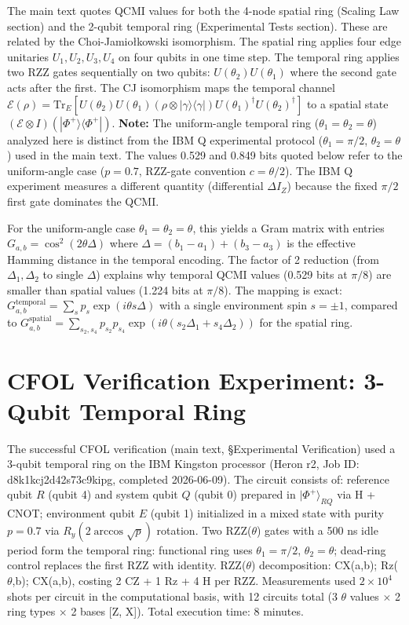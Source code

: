 \documentclass[aps,prl,showpacs]{revtex4-2}
\begin{document}
The main text quotes QCMI values for both the 4-node spatial ring (Scaling Law section) and the 2-qubit temporal ring (Experimental Tests section). These are related by the Choi-Jamio{\l}kowski isomorphism. The spatial ring applies four edge unitaries $U_1,U_2,U_3,U_4$ on four qubits in one time step. The temporal ring applies two RZZ gates sequentially on two qubits: $U(\theta_2)U(\theta_1)$ where the second gate acts after the first. The CJ isomorphism maps the temporal channel $\mathcal{E}(\rho) = \mathrm{Tr}_E[U(\theta_2)U(\theta_1)(\rho\otimes|\gamma\rangle\langle\gamma|)U(\theta_1)^\dagger U(\theta_2)^\dagger]$ to a spatial state $(\mathcal{E}\otimes I)(|\Phi^+\rangle\langle\Phi^+|)$. \textbf{Note:} The uniform-angle temporal ring ($\theta_1=\theta_2=\theta$) analyzed here is distinct from the IBM Q experimental protocol ($\theta_1=\pi/2$, $\theta_2=\theta$) used in the main text. The values 0.529 and 0.849 bits quoted below refer to the uniform-angle case ($p=0.7$, RZZ-gate convention $c=\theta/2$). The IBM Q experiment measures a different quantity (differential $\Delta I_Z$) because the fixed $\pi/2$ first gate dominates the QCMI.

For the uniform-angle case $\theta_1=\theta_2=\theta$, this yields a Gram matrix with entries $G_{a,b} = \cos^2(2\theta\Delta)$ where $\Delta = (b_1-a_1)+(b_3-a_3)$ is the effective Hamming distance in the temporal encoding. The factor of 2 reduction (from $\Delta_1,\Delta_2$ to single $\Delta$) explains why temporal QCMI values (0.529 bits at $\pi/8$) are smaller than spatial values (1.224 bits at $\pi/8$). The mapping is exact: $G^{\mathrm{temporal}}_{a,b} = \sum_{s} p_s \exp(i\theta s\Delta)$ with a single environment spin $s=\pm 1$, compared to $G^{\mathrm{spatial}}_{a,b} = \sum_{s_2,s_4} p_{s_2}p_{s_4} \exp(i\theta(s_2\Delta_1+s_4\Delta_2))$ for the spatial ring.


\section{CFOL Verification Experiment: 3-Qubit Temporal Ring}

The successful CFOL verification (main text, \S Experimental Verification) used a 3-qubit temporal ring on the IBM Kingston processor (Heron r2, Job ID: d8k1kcj2d42s73c9kipg, completed 2026-06-09). The circuit consists of: reference qubit $R$ (qubit 4) and system qubit $Q$ (qubit 0) prepared in $|\Phi^+\rangle_{RQ}$ via H + CNOT; environment qubit $E$ (qubit 1) initialized in a mixed state with purity $p=0.7$ via $R_y(2\arccos\sqrt{p})$ rotation. Two RZZ($\theta$) gates with a 500 ns idle period form the temporal ring: functional ring uses $\theta_1=\pi/2$, $\theta_2=\theta$; dead-ring control replaces the first RZZ with identity. RZZ($\theta$) decomposition: CX(a,b); Rz($\theta$,b); CX(a,b), costing 2 CZ + 1 Rz + 4 H per RZZ. Measurements used $2\times10^4$ shots per circuit in the computational basis, with 12 circuits total (3 $\theta$ values $\times$ 2 ring types $\times$ 2 bases [Z, X]). Total execution time: 8 minutes.
\end{document}
